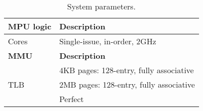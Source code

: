 
\begin{table}
	\begin{center}
		\caption{System parameters.}
		\scalebox{0.7}
		\small
		\vspace{0.01in}
		\label{table:system}
		\renewcommand{\arraystretch}{1.0} 
		{\scriptsize
			\begin{tabular}{ l  l }
				\toprule
				{\bf MPU logic}                  & {\bf Description}  \\
				\toprule
				\multirow{1}{*}{Cores}                       &  Single-issue, in-order, 2GHz \\ 
				\toprule
				{\bf MMU}                  & {\bf Description}  \\
				\toprule
				
				
				\multirow{3}{*}{TLB}	& $4$KB pages: 128-entry, fully associative \\
				& $2$MB pages: 128-entry, fully associative \\
				
				\cmidrule{2-2}
				\multirow{1}{*}{MMU Caches} 	&	Perfect \\ 
				
				

\end{tabular}}
\end{center}
\end{table}
